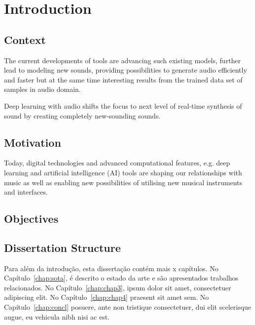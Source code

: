 \chapter{Introduction} \label{chap:intro}

\section{Context} \label{sec:context}

The current developments of tools are advancing such existing models, further lead to modeling new sounds, providing possibilities to generate audio efficiently and faster but at the same time interesting results from the trained data set of samples in audio domain. \cite{tahiroglu_-terity_2020}

Deep learning with audio shifts the focus to next level of real-time synthesis of sound by creating completely new-sounding sounds. \cite{tahiroglu_-terity_2020}

\section{Motivation} \label{sec:motivation}

Today, digital technologies and advanced computational features, e.g. deep learning and artificial intelligence (AI) tools are shaping our relationships with music as well as enabling new possibilities of utilising new musical instruments and interfaces. \cite{tahiroglu_-terity_2020}

\section{Objectives} \label{sec:objectives}


\section{Dissertation Structure} \label{sec:struct}

Para além da introdução, esta dissertação contém mais x capítulos.
No Capítulo~\ref{chap:sota}, é descrito o estado da arte e são
apresentados trabalhos relacionados. 
No Capítulo~\ref{chap:chap3}, ipsum dolor sit amet, consectetuer
adipiscing elit.
No Capítulo~\ref{chap:chap4} praesent sit amet sem. 
No Capítulo~\ref{chap:concl} posuere, ante non tristique
consectetuer, dui elit scelerisque augue, eu vehicula nibh nisi ac
est. 
